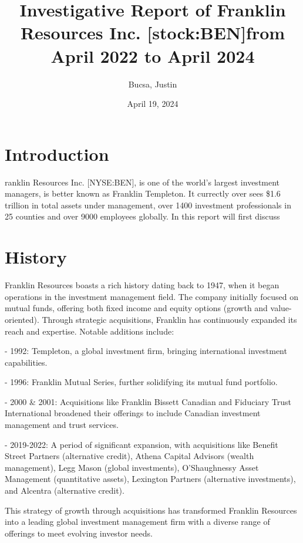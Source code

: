 \documentclass[9pt,a4paper,twoside]{tau}
\title{Investigative Report of Franklin Resources Inc. [stock:BEN]from April 2022 to April 2024}
\author[a,1]{Bucsa, Justin}
\affil[a]{Stealth}
\date{April 19, 2024}
\begin{document}
		
	\maketitle
	\thispagestyle{firststyle}
	\tauabstract
	\tableofcontents


\section{Introduction}

    ranklin Resources Inc. [NYSE:BEN], is one of the world's largest investment managers, is better known as Franklin Templeton. It currectly over sees \$1.6 trillion in total assets under management, over 1400 investment professionals in 25 counties and over 9000 employees globally. In this report will first discuss

\section{History}
    Franklin Resources boasts a rich history dating back to 1947, when it began operations in the investment management field. The company initially focused on mutual funds, offering both fixed income and equity options (growth and value-oriented). Through strategic acquisitions, Franklin has continuously expanded its reach and expertise. Notable additions include:

    - 1992: Templeton, a global investment firm, bringing international investment capabilities.
    
    - 1996: Franklin Mutual Series, further solidifying its mutual fund portfolio.

    - 2000 \& 2001: Acquisitions like Franklin Bissett Canadian and Fiduciary Trust International broadened their offerings to include Canadian investment management and trust services.
    
    - 2019-2022: A period of significant expansion, with acquisitions like Benefit Street Partners (alternative credit), Athena Capital Advisors (wealth management), Legg Mason (global investments), O’Shaughnessy Asset Management (quantitative assets), Lexington Partners (alternative investments), and Alcentra (alternative credit).
    
    This strategy of growth through acquisitions has transformed Franklin Resources into a leading global investment management firm with a diverse range of offerings to meet evolving investor needs.
    
\end{document}
